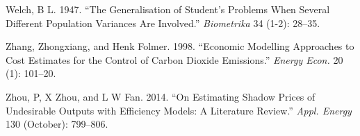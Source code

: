 \documentclass[
  10pt,
]{article}
\begin{document}
\leavevmode\hypertarget{ref-Welch1947}{}%
Welch, B L. 1947. ``The Generalisation of Student's Problems When
Several Different Population Variances Are Involved.'' \emph{Biometrika}
34 (1-2): 28--35.

\leavevmode\hypertarget{ref-Zhang1998}{}%
Zhang, Zhongxiang, and Henk Folmer. 1998. ``Economic Modelling
Approaches to Cost Estimates for the Control of Carbon Dioxide
Emissions.'' \emph{Energy Econ.} 20 (1): 101--20.

\leavevmode\hypertarget{ref-Zhou2014}{}%
Zhou, P, X Zhou, and L W Fan. 2014. ``On Estimating Shadow Prices of
Undesirable Outputs with Efficiency Models: A Literature Review.''
\emph{Appl. Energy} 130 (October): 799--806.
\end{document}
